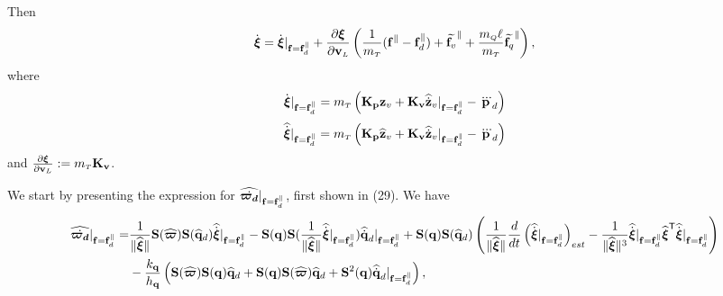 \documentclass[journal,onecolumn]{IEEEtran}
\begin{document}
Then
%
\begin{align}
	\dot{\Xiq} = \dot{\Xiq}|_{\f=\fd^{\|}} + \frac{\partial \Xiq}{\partial \vL}\LP\frac{1}{\mT}(\f^{\|}-\fd^{\|}) + \widetilde{\f_v}^{\|} + \frac{\mQ\ellp}{\mT}\widetilde{\f_q}^{\|}\RP,
\end{align}
%
where
%
\begin{align}
	\dot{\Xiq}|_{\f=\fd^{\|}} = \mT\LP {\bf K_p}\zv + {\bf K_v} \zvdothat|_{\f=\fd^{\|}}
	- \pLdtdot\RP
\end{align}
%
\begin{align}
	\widehat{\dot{\Xiq}}|_{\f=\fd^{\|}} = \mT\LP {\bf K_p}\zvhat + {\bf K_v} \zvdothat|_{\f=\fd^{\|}}
	- \pLdtdot\RP
\end{align}
%
and $\frac{\partial \Xiq}{\partial \vL}:=\mT{\bf K_v}$.

	We start by presenting the expression for $\widehat{\dot{\bs{\varpi_d}}}|_{\f=\fd^{\|}}$, first shown in (29).
    We have
    \begin{align}
    	\widehat{\dot{\bs{\varpi_d}}}|_{\f=\fd^{\|}} =& \frac{1}{\|\widehat{\Xiq}\|}
    	\Skew{\widehat{\bs{\varpi}}}\Skew{\qdhat}\widehat{\dot{\Xiq}}|_{\f=\f_d^{\|}}
    	-\Skew{\dir}\Skew{\frac{1}{\|\widehat{\Xiq}\|}\widehat{\dot{\Xiq}}|_{\f=\f_d^{\|}}}\qddothat|_{\f=\f_d^{\|}} +\Skew{\dir}\Skew{\qdhat}\LP\frac{1}{\|\widehat{\Xiq}\|}\frac{d}{dt}\LP\widehat{\dot{\Xiq}}|_{\f=\fd^{\|}}\RP_{est}
    	-\frac{1}{\|\widehat{\Xiq}\|^3}\widehat{\dot{\Xiq}}|_{\f=\f_d^{\|}}\widehat{\Xiq}\trs\widehat{\dot{\Xiq}}|_{\f=\f_d^{\|}}\RP\nonumber\\ &-\frac{k_\v{q}}{h_\v{q}}\LP\Skew{\widehat{\bs{\varpi}}}\Skew{\dir}\qdhat +\Skew{\dir}\Skew{\widehat{\bs{\varpi}}}\qdhat +\Skew[2]{\dir}\qddothat|_{\f=\f_d^{\|}}\RP,
    \end{align}
\end{document}
